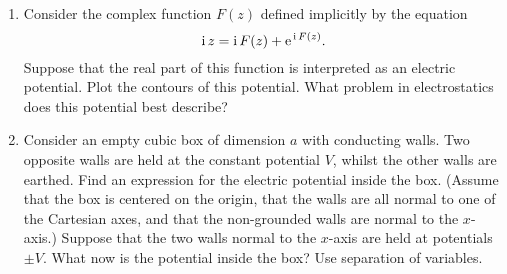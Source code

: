 {\begin{enumerate}
\item Consider the complex function $F(z)$ defined implicitly by the
equation
$$
{\rm i}\,z = {\rm i}\,F(z) + {\rm e}^{\,{\rm i}\,F(z)}.
$$
Suppose that the real part of this function is interpreted as an electric
potential. Plot the contours of this potential. What problem in electrostatics does this potential best describe?
\item Consider an empty cubic box of dimension $a$ with conducting walls.
Two opposite walls are held at the constant potential $V$, whilst the
other walls are earthed. Find an expression for the electric potential
inside the box. (Assume that the box is centered on the origin, that the
walls are all normal to one of the Cartesian axes, and that the non-grounded
walls are normal to the $x$-axis.) Suppose that the two walls normal
to the $x$-axis are held at potentials $\pm V$. What now is the potential
inside the box? Use separation of variables.
\end{enumerate}
\renewcommand{\theenumi}{arabic{enumi}}
}
